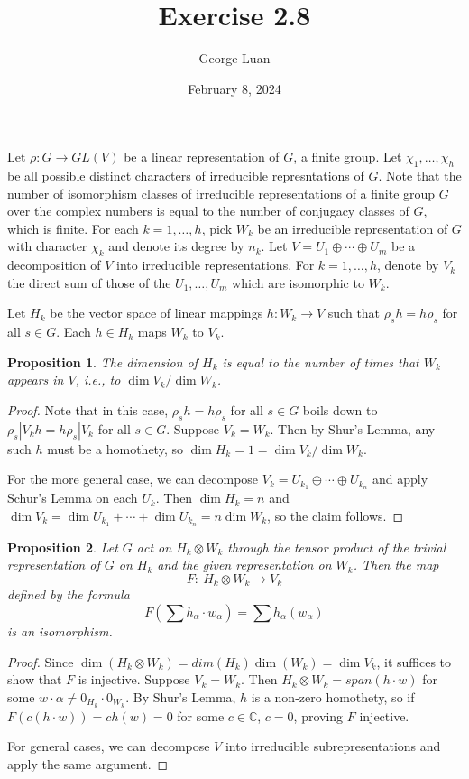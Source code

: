 \documentclass{article}
\title{Exercise 2.8}
\author{George Luan}
\date{February 8, 2024} %
\newtheorem{prop}{Proposition}[section]
\begin{document}
\maketitle

\noindent
Let $\rho: G \to GL(V)$ be a linear representation of $G$, a finite group. Let $\chi_1, \dots, \chi_h$ be all possible distinct characters of irreducible represntations of $G$. Note that the number of isomorphism classes of irreducible representations of a finite group $G$ over the complex numbers is equal to the number of conjugacy classes of $G$, which is finite. For each $k = 1, \dots, h$, pick $W_k$ be an irreducible representation of $G$ with character $\chi_{k}$ and denote its degree by $n_k$. Let $V = U_1 \oplus \cdots \oplus U_m$ be a decomposition of $V$ into irreducible representations. For $k = 1, \dots, h$, denote by $V_k$ the direct sum of those of the $U_1, \dots, U_m$ which are isomorphic to $W_k$.

\medskip
\noindent
Let $H_k$ be the vector space of linear mappings $h: W_k \to V$ such that $\rho_s h = h\rho_s$ for all $s \in G$. Each $h \in H_k$ maps $W_k$ to $V_k$.
\begin{prop} The dimension of $H_k$ is equal to the number of times that $W_k$ appears in $V$, i.e., to $\dim V_k / \dim W_k$.
\end{prop}
\begin{proof}
    Note that in this case, $\rho_s h = h\rho_s$ for all $s \in G$ boils down to $\rho_s|V_k h = h\rho_s|V_k$ for all $s \in G$. Suppose $V_k = W_k$. Then by Shur's Lemma, any such $h$ must be a homothety, so $\dim H_k = 1 = \dim V_k / \dim W_k$.
    
    For the more general case, we can decompose $V_k = U_{k_1} \oplus \cdots \oplus U_{k_n}$ and apply Schur's Lemma on each $U_k$. Then $\dim H_k = n$ and $\dim V_k = \dim U_{k_1} + \cdots + \dim U_{k_n} = n\dim W_k$, so the claim follows.  
\end{proof}

\begin{prop} Let $G$ act on $H_k \otimes W_k$ through the tensor product of the trivial representation of $G$ on $H_k$ and the given representation on $W_k$. Then the map
    $$ F: \ H_k \otimes W_k \to V_k $$
defined by the formula
    $$ F\left( \sum h_\alpha \cdot w_\alpha \right) = \sum h_\alpha(w_\alpha) $$
is an isomorphism.
\end{prop}
\begin{proof}
    Since $\dim (H_k \otimes W_k) = dim (H_k)\dim(W_k) = \dim V_k$, it suffices to show that $F$ is injective. Suppose $V_k = W_k$. Then $H_k \otimes W_k = span(h \cdot w)$ for some $w \cdot \alpha \neq 0_{H_k} \cdot 0_{W_k}$. By Shur's Lemma, $h$ is a non-zero homothety, so if $F(c(h\cdot w)) = ch(w) = 0$ for some $c \in \mathbb{C}$, $c = 0$, proving $F$ injective.
    
    For general cases, we can decompose $V$ into irreducible subrepresentations and apply the same argument.
\end{proof}
\end{document}
